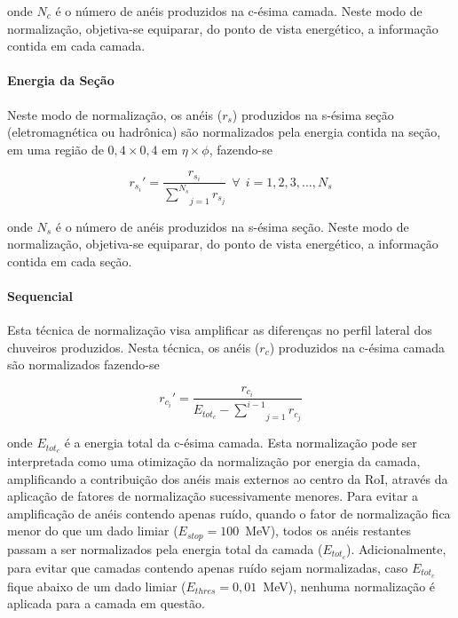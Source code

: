 \noindent onde $N_c$ é o número de anéis produzidos na c-ésima camada. Neste modo de normalização, 
objetiva-se equiparar, do ponto de vista energético, a informação contida em cada camada.


\paragraph{Energia da Seção}
\label{par:norm_secao}

Neste modo de normalização, os anéis ($r_s$) produzidos na s-ésima seção (eletromagnética 
ou hadrônica) são normalizados pela energia contida na seção, em uma região de $0,4 \times 0,4$ 
em $\eta \times \phi$, fazendo-se

\begin{equation}
r_{s_{i}}' = \frac{r_{s_{i}}}{\underset{j=1}{\overset{N_s}{ \sum}} r_{s_{j}}}~~\forall~~i=1,2,3,...,N_s
\end{equation}

\noindent onde $N_s$ é o número de anéis produzidos na s-ésima seção. Neste modo de normalização, 
objetiva-se equiparar, do ponto de vista energético, a informação contida em cada seção.


\paragraph{Sequencial}
\label{par:norm_seq}

Esta técnica de normalização visa amplificar as diferenças no perfil lateral dos chuveiros produzidos. 
Nesta técnica, os anéis ($r_c$) produzidos na c-ésima camada são normalizados fazendo-se

\begin{equation}
\label{eq:normalizacao_sequencial}
r_{c_{i}}' = \frac{r_{c_{i}}}{ E_{tot_{c}} - \underset{j=1}{\overset{i-1}{\sum}} r_{c_{j}} }
\end{equation}

\noindent onde $E_{tot_{c}}$ é a energia total da c-ésima camada. Esta normalização pode ser interpretada 
como uma otimização da normalização por energia da camada, amplificando a contribuição dos anéis mais 
externos ao centro da RoI, através da aplicação de fatores de normalização sucessivamente menores. Para 
evitar a amplificação de anéis contendo apenas ruído, quando o fator de normalização fica menor do que 
um dado limiar  ($E_{stop} = 100$~MeV), todos os anéis restantes passam a ser normalizados pela energia 
total da camada ($E_{tot_{c}}$). Adicionalmente, para evitar que camadas contendo apenas ruído sejam 
normalizadas, caso $E_{tot_{c}}$ fique abaixo de um dado limiar ($E_{thres} = 0,01$~MeV), nenhuma 
normalização é aplicada para a camada em questão.


